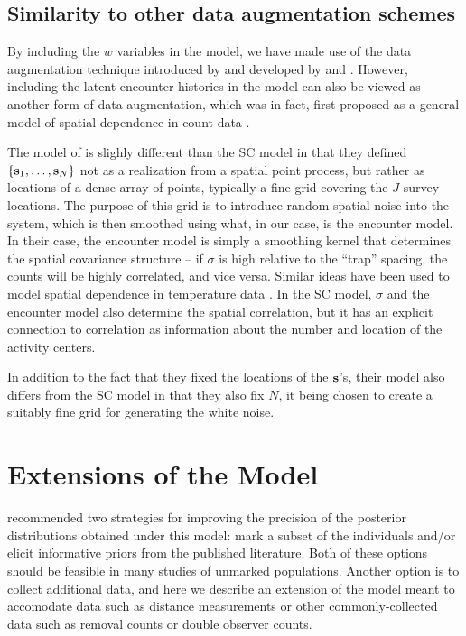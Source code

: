 \subsection{Similarity to other data augmentation schemes}

By including the $w$ variables in the model, we have made use of the
data augmentation technique introduced by \citet{royle_etal:2007} and
developed by \citep{royle:2009} and
\citep{royle_dorazio:2010}. However, including the latent encounter
histories in the model can also be viewed as another form of data
augmentation, which was in fact, first proposed as a general model of
spatial dependence in count data
\citep{wolpert_ickstadt:1998}.

The model of
\citet{wolpert_ickstadt:1998} is slighly different than the SC model
in that they defined $\{{\bf s}_1, \ldots, {\bf s}_N\}$ not as a
realization from a spatial point process, but rather as locations of a
dense array of points, typically a fine grid covering the $J$ survey
locations. The purpose of this grid is to introduce random spatial noise into the system,
which is then smoothed using what, in our case, is the encounter
model. In their case, the encounter model is simply a smoothing
kernel that determines the spatial covariance structure -- if $\sigma$
is high relative to the ``trap'' spacing, the counts will be highly
correlated, and vice versa. Similar ideas have been used to model
spatial dependence in temperature data \citep{higdon:1998}. In the SC
model, $\sigma$ and the encounter model also determine the spatial
correlation, but it has an explicit connection to
correlation as information about the number and location of the
activity centers.

In addition to the fact that they fixed
the locations of the $\bf s$'s, their model also differs from the SC
model in that they also fix $N$, it being chosen to create a suitably
fine grid for generating the white noise.




\section{Extensions of the Model}
\label{unmarked.ext}

\citet{chandler_royle:2012} recommended two strategies for improving
the precision of the posterior distributions obtained under this
model: mark a subset of the individuals and/or elicit informative
priors from the published literature. Both of these options should be
feasible in many studies of unmarked populations. Another option is to collect
additional data, and here we describe an extension of the model meant
to accomodate data such as distance measurements or other
commonly-collected data such as removal counts or double observer
counts.









